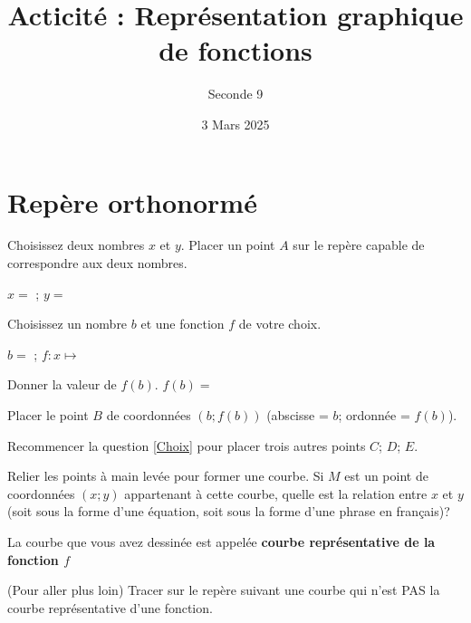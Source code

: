 \documentclass{article}
\title{Acticité : Représentation graphique de fonctions}
\author{Seconde 9}
\date{3 Mars 2025}
\begin{document}
\maketitle

\section{Repère orthonormé}
\begin{center}
\end{center}

\begin{enumquestions}
\item Choisissez deux nombres $x$ et $y$. Placer un point $A$ sur le repère capable de correspondre aux deux nombres.

$x=$ \answersline; $y=$ \answersline
\item\label{Choix} Choisissez un nombre $b$ et une fonction $f$ de votre choix.

$b=$ \answersline; $f : x \mapsto$ \answersline

Donner la valeur de $f(b)$. $f(b)=$ \answersline

Placer le point $B$ de coordonnées $(b;f(b))$ (abscisse = $b$; ordonnée = $f(b)$).
\item Recommencer la question \ref{Choix} pour placer trois autres points $C$; $D$; $E$.
\item Relier les points à main levée pour former une courbe. Si $M$ est un point de coordonnées $(x;y)$ appartenant à cette courbe, quelle est la relation entre $x$ et $y$ (soit sous la forme d'une équation, soit sous la forme d'une phrase en français)?

\answersline

\begin{tcolorbox}
La courbe que vous avez dessinée est appelée \textbf{courbe représentative de la fonction $f$}
\end{tcolorbox}

\item (Pour aller plus loin) Tracer sur le repère suivant une courbe qui n'est \textsc{PAS} la courbe représentative d'une fonction.
\begin{center}
\end{center}

\end{enumquestions}
\end{document}
